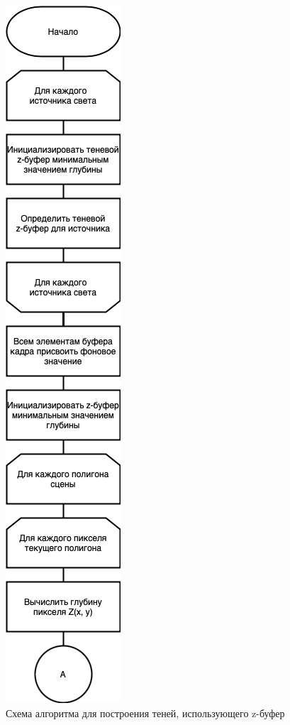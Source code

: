 \begin{figure}[h]
    \centering
    \includegraphics[width=0.23\linewidth]{img/shadow1.png}
    \caption{Схема алгоритма для построения теней, использующего z-буфер}
    \label{img:shadow1}
\end{figure}
\noindent

